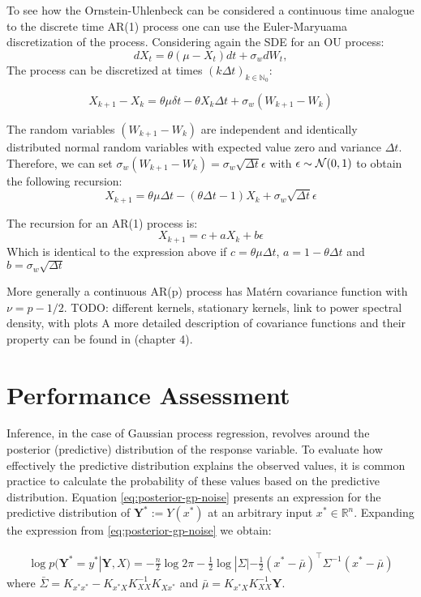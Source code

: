 To see how the Ornstein-Uhlenbeck can be considered a continuous time analogue to the discrete time
AR(1) process one can use the Euler-Maryuama discretization of the process.
Considering again the SDE for an OU process:
$$dX_t = \theta (\mu - X_t)dt + \sigma_w dW_t,$$
The process can be discretized at times $(k \Delta t)_{k \in \mathbb{N}_0}$:

$$ X_{k+1} - X_k = \theta \mu \delta t - \theta X_k \Delta t + \sigma_w (W_{k+1} - W_k)$$

The random variables $(W_{k+1} - W_k)$ are independent and identically distributed normal random variables
with expected value zero and variance $\Delta t$.
Therefore, we can set $\sigma_w (W_{k+1} - W_k) = \sigma_w \sqrt{\Delta t} \epsilon$ with $\epsilon \sim \operatorname{\mathcal{N}}(0,1)$
to obtain the following recursion:
$$ X_{k+1} = \theta \mu \Delta t - (\theta \Delta t - 1) X_k + \sigma_w \sqrt{\Delta t} \epsilon$$

The recursion for an AR(1) process is:
$$ X_{k+1} = c + a X_k + b \epsilon$$
Which is identical to the expression above if $c= \theta \mu \Delta t$, $a=1- \theta \Delta t$ and
$b= \sigma_w \sqrt{\Delta t}$



More generally a continuous AR(p) process has Matérn covariance function with $\nu = p - 1/2$.
TODO: different kernels, stationary kernels, link to power spectral density, with plots
A more detailed description of covariance functions and their property can be found
in \citeauthor{rasmussen_gaussian_2006} (chapter 4).

\section{Performance Assessment}\label{sec:performance-assessment}
Inference, in the case of Gaussian process regression, revolves around the posterior (predictive) distribution
of the response variable. To evaluate how effectively the predictive distribution explains the observed values,
it is common practice to calculate the probability of these values based on the predictive distribution.
Equation \ref{eq:posterior-gp-noise} presents an expression for the predictive distribution of
$\mathbf{Y^{\ast}}:= Y(x^{\ast})$ at an arbitrary input $x^{\ast} \in \mathbb{R}^{n}$.
Expanding the expression from \ref{eq:posterior-gp-noise} we obtain:

\begin{gather}\label{eq:predictive-dist}
    \log p(\mathbf{Y^{\ast}} = y^{\ast}| \mathbf{Y}, X) =
    -\frac{n}{2} \log 2 \pi - \frac{1}{2} \log|\Sigma| -
        \frac{1}{2}(x^{\ast} - \bar{\mu})^{\top} \Sigma^{-1} (x^{\ast} - \bar{\mu})
\end{gather}
where
$\bar{\Sigma} = K_{x^{\ast}x^{\ast}} - K_{x^{\ast}X} K_{XX}^{-1} K_{Xx^{\ast}}$
and $\bar{\mu} = K_{x^{\ast}X} K_{XX}^{-1} \mathbf{Y}$.

